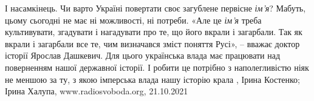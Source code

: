 І насамкінець. Чи варто Україні повертати своє загублене первісне \emph{ім’я}?
Мабуть, цьому сьогодні не має ні можливості, ні потреби.  «Але це \emph{ім’я} треба
культивувати, згадувати і нагадувати про те, що його вкрали і загарбали. Так як
вкрали і загарбали все те, чим визначався зміст поняття Русі», – вважає доктор
історії Ярослав Дашкевич. Для цього українська влада має працювати над
поверненням нашої державної історії. І робити це потрібно з наполегливістю ніяк
не меншою за ту, з якою імперська влада нашу історію крала
, 
Ірина Костенко; Ірина Халупа, www.radiosvoboda.org, 21.10.2021
